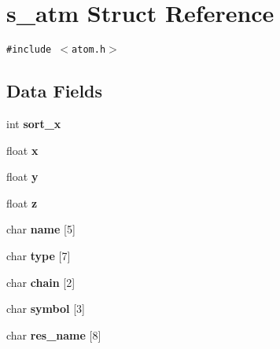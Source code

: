 \hypertarget{structs__atm}{
\section{s\_\-atm Struct Reference}
\label{structs__atm}
}
{\tt \#include $<$atom.h$>$}

\subsection*{Data Fields}
\begin{CompactItemize}
\item 
\hypertarget{structs__atm_05407d7638ff7f6fc210026306def9b5}{
int \textbf{sort\_\-x}}
\label{structs__atm_05407d7638ff7f6fc210026306def9b5}

\item 
\hypertarget{structs__atm_2bf748fbcd9b6d0a472b292a6b244ed5}{
float \textbf{x}}
\label{structs__atm_2bf748fbcd9b6d0a472b292a6b244ed5}

\item 
\hypertarget{structs__atm_72534af707e830760a209fec348bc1af}{
float \textbf{y}}
\label{structs__atm_72534af707e830760a209fec348bc1af}

\item 
\hypertarget{structs__atm_f7cae749a2d07ffb393317f12745170a}{
float \textbf{z}}
\label{structs__atm_f7cae749a2d07ffb393317f12745170a}

\item 
\hypertarget{structs__atm_2f0330a30f640668efdd726a6dd05a93}{
char \textbf{name} \mbox{[}5\mbox{]}}
\label{structs__atm_2f0330a30f640668efdd726a6dd05a93}

\item 
\hypertarget{structs__atm_98466fdfcb021884beb229b1dca361ae}{
char \textbf{type} \mbox{[}7\mbox{]}}
\label{structs__atm_98466fdfcb021884beb229b1dca361ae}

\item 
\hypertarget{structs__atm_c5b9464bd67f2cca101f7bf6beabb223}{
char \textbf{chain} \mbox{[}2\mbox{]}}
\label{structs__atm_c5b9464bd67f2cca101f7bf6beabb223}

\item 
\hypertarget{structs__atm_c80daffa94edeadd30433f6653e08054}{
char \textbf{symbol} \mbox{[}3\mbox{]}}
\label{structs__atm_c80daffa94edeadd30433f6653e08054}

\item 
\hypertarget{structs__atm_e0ff20f2c491a8b16c866d9b1386b6a5}{
char \textbf{res\_\-name} \mbox{[}8\mbox{]}}
\label{structs__atm_e0ff20f2c491a8b16c866d9b1386b6a5}


\end{CompactItemize}
